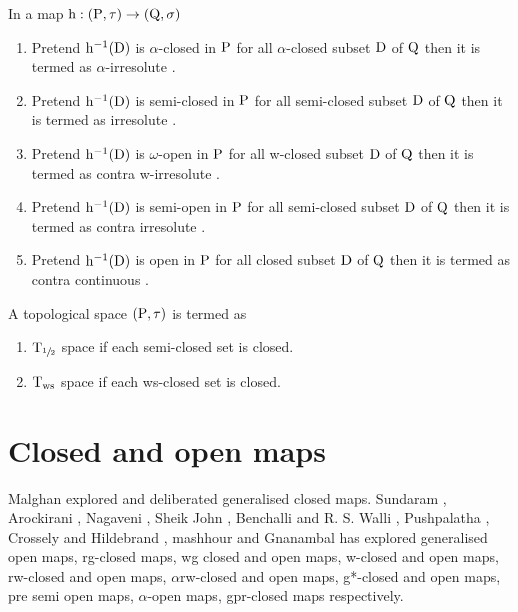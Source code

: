 \begin{dfn}\label{dfn1.3.2} 
In a map $\mathrm{h}: (\mathrm{P}, \tau) \rightarrow (\mathrm{Q}, \sigma)$
\begin{enumerate}
\item Pretend $\mathrm{h}^{-1}(\mathrm{D})$ is $\alpha$-closed in $\mathrm{P}$ for all $\alpha$-closed subset $\mathrm{D}$ of $\mathrm{Q}$ then it is termed as $\alpha$-irresolute \cite{Maki11}. 
\item Pretend $\mathrm{h}^{-1}(\mathrm{D})$ is semi-closed in $\mathrm{P}$ for all semi-closed subset $\mathrm{D}$ of $\mathrm{Q}$ then it is termed as irresolute \cite{Crossley}.
\item Pretend $\mathrm{h}^{-1}(\mathrm{D})$ is $\omega$-open in $\mathrm{P}$ for all w-closed subset $\mathrm{D}$ of $\mathrm{Q}$ then it is termed as contra w-irresolute \cite{Sheik1}. 
\item Pretend $\mathrm{h}^{-1}(\mathrm{D})$ is semi-open in $\mathrm{P}$ for all semi-closed subset $\mathrm{D}$ of $\mathrm{Q}$ then it is termed as contra irresolute \cite{Baker}. 
\item Pretend $\mathrm{h}^{-1}(\mathrm{D})$ is open in $\mathrm{P}$ for all closed subset $\mathrm{D}$ of $\mathrm{Q}$ then it is termed as contra continuous \cite{Dontchev1}. 
\end{enumerate}
\end{dfn}


\begin{dfn}\label{dfn1.3.3} 
A topological space $(\mathrm{P}, \tau)$ is termed as 
\begin{enumerate}[\rm i)]
\item $\mathrm{T}_{\sfrac{1}{2}}$ space \cite{Malghan} if each semi-closed set is closed. 
\item $\mathrm{T}_{\text{ws}}$ space \cite{Basavaraj} if each ws-closed set is closed. 
\end{enumerate}
\end{dfn}

\section{Closed and open maps}

Malghan \cite{Malghan} explored and deliberated generalised closed maps. Sundaram \cite{Maki2}, Arockirani \cite{Arockiarani}, Nagaveni \cite{Nagaveni}, Sheik John \cite{Sheik1}, Benchalli \cite{Benchalli} and R. S. Walli \cite{Wali2}, Pushpalatha \cite{Pushpalatha}, Crossely and Hildebrand \cite{Crossely}, mashhour \cite{Abd1} and Gnanambal \cite{Gnanambal} has explored generalised open maps, rg-closed maps, wg closed and open maps, w-closed and open maps, rw-closed and open maps, $\alpha$rw-closed and open maps, g*-closed and open maps, pre semi open maps, $\alpha$-open maps, gpr-closed maps respectively.

